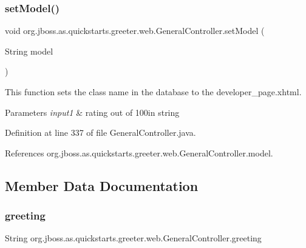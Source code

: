 \subsubsection{\texorpdfstring{set\+Model()}{setModel()}}
{\footnotesize\ttfamily void org.\+jboss.\+as.\+quickstarts.\+greeter.\+web.\+General\+Controller.\+set\+Model (\begin{DoxyParamCaption}\item[{String}]{model }\end{DoxyParamCaption})}



This function sets the class name in the database to the developer\+\_\+page.\+xhtml. 


\begin{DoxyParams}{Parameters}
{\em input1} & rating out of 100in string \\
\hline
\end{DoxyParams}


Definition at line 337 of file General\+Controller.\+java.



References org.\+jboss.\+as.\+quickstarts.\+greeter.\+web.\+General\+Controller.\+model.



\subsection{Member Data Documentation}
\mbox{\label{classorg_1_1jboss_1_1as_1_1quickstarts_1_1greeter_1_1web_1_1_general_controller_a692b8a8a7a28e94932aee83bd88d4e55}} 
\subsubsection{\texorpdfstring{greeting}{greeting}}
{\footnotesize\ttfamily String org.\+jboss.\+as.\+quickstarts.\+greeter.\+web.\+General\+Controller.\+greeting\hspace{0.3cm}{\ttfamily [private]}}



